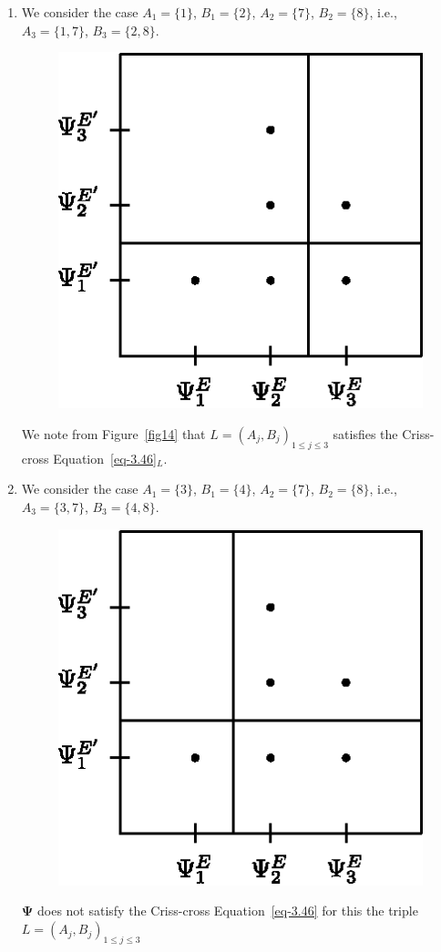 \documentclass[a4paper,12pt]{article}
\theoremstyle{definition}
\theoremstyle{underlinethm}
\theoremstyle{definition}
\begin{document}

\begin{enumerate}[label=(\alph*)]

\item  We consider the case $A_{1} = \{1\}$, $B_{1}=\{2\}$, $A_{2} = \{7\}$, $B_{2} = \{8\}$, i.e., $A_{3}= \{1,7\}$, $B_{3} = \{2,8\}$.

\begin{figure}[h]
\centering
\includegraphics[scale=.9]{figure/figures/fig14.eps}
\caption{}\label{fig14}
\end{figure} 

We note from Figure~\eqref{fig14} that $L=(A_{j}, B_{j})_{1 \leq j \leq 3}$ satisfies the Criss-cross  Equation~\eqref{eq-3.46}$_{L}$.

\newpage

\item We consider the case $A_{1} = \{3\}$, $B_{1} = \{4\}$, $A_{2} = \{7\}$, $B_{2}=\{8\}$, i.e., $A_{3} = \{3,7\}$, $B_{3}= \{4,8\}$.
\begin{figure}[h]
\centering
\includegraphics[scale=.9]{figure/figures/fig15.eps}
\caption{}\label{fig15}
\end{figure} 
$\boldsymbol{\Psi}$ does not satisfy the Criss-cross Equation~\eqref{eq-3.46} for this the triple  $L = \left(A_{j}, B_{j}\right)_{1 \leq j \leq 3}$


\end{enumerate}
\end{document}
